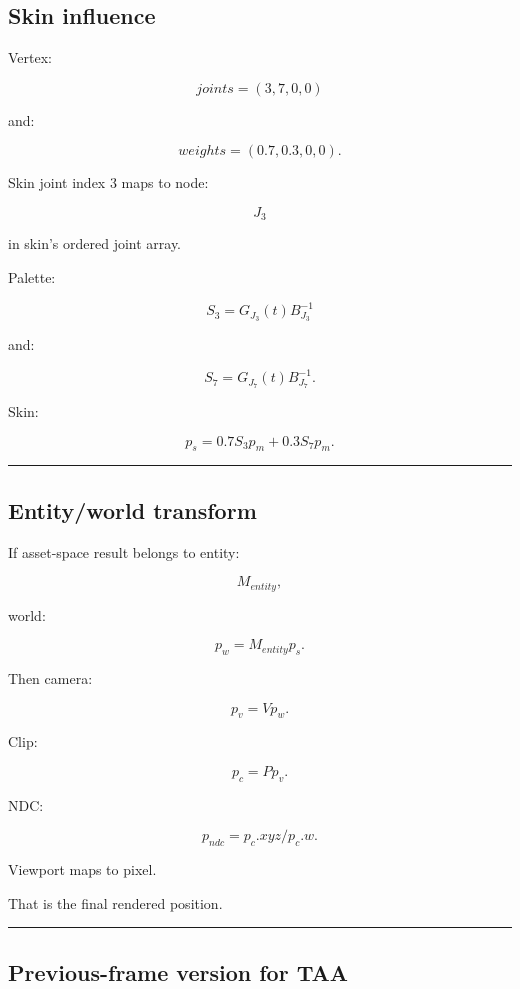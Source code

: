\subsection{Skin influence}\label{04-visual-computing-ii-ch041-skin-influence}

Vertex:

\[
joints=
(3,7,0,0)
\]

and:

\[
weights=
(0.7,0.3,0,0).
\]

Skin joint index 3 maps to node:

\[
J_3
\]

in skin's ordered joint array.

Palette:

\[
S_3=
G_{J_3}(t)
B_{J_3}^{-1}
\]

and:

\[
S_7=
G_{J_7}(t)
B_{J_7}^{-1}.
\]

Skin:

\[
\boxed{
p_s
=
0.7S_3p_m
+
0.3S_7p_m.
}
\]

\begin{center}\rule{0.5\linewidth}{0.5pt}\end{center}

\subsection{Entity/world transform}\label{04-visual-computing-ii-ch041-entityworld-transform}

If asset-space result belongs to entity:

\[
M_{entity},
\]

world:

\[
\boxed{
p_w=
M_{entity}p_s.
}
\]

Then camera:

\[
p_v=
Vp_w.
\]

Clip:

\[
\boxed{
p_c=
Pp_v.
}
\]

NDC:

\[
p_{ndc}
=
p_c.xyz/p_c.w.
\]

Viewport maps to pixel.

That is the final rendered position.

\begin{center}\rule{0.5\linewidth}{0.5pt}\end{center}

\subsection{Previous-frame version for TAA}\label{04-visual-computing-ii-ch041-previous-frame-version-for-taa}

